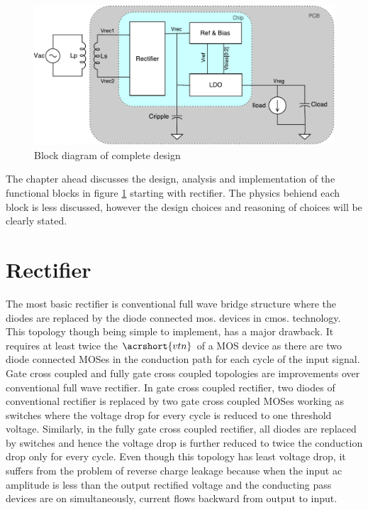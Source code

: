 \documentclass[12pt,a4paper,UKenglish]{article}
\begin{document}
\begin{figure}[!htbp] %
   \centering
   \includegraphics[width=\textwidth]{img/block_diagram.pdf}
   \caption{Block diagram of complete design}
   \label{fig:funct_block}
\end{figure}

The chapter ahead discusses the design, analysis and implementation of the functional blocks in figure 
\ref{fig:funct_block} starting with rectifier. The physics behiend each block is less discussed, however the 
design choices and reasoning of choices will be clearly stated. 

\clearpage
\newpage

\section{Rectifier}
The most basic rectifier is conventional full wave bridge structure where the diodes are replaced by the diode connected \acrshort{mos}. devices in \acrshort{cmos}. technology. This topology though being simple to implement, has a major drawback. It requires at least twice the $\acrshort{vtn}$ of a MOS device as there are two diode connected MOSes in the conduction path for each cycle of the input signal.  \\

Gate cross coupled and fully gate cross coupled topologies are improvements over conventional full wave rectifier. In gate cross coupled rectifier, two diodes of conventional rectifier is replaced by two gate cross coupled MOSes working as switches where the voltage drop for every cycle is reduced to one threshold voltage. Similarly, in the fully gate cross coupled rectifier, all diodes are replaced by switches and hence the voltage drop is further reduced to twice the conduction drop only for every cycle. Even though this topology has least voltage drop, it suffers from the problem of reverse charge leakage because when the input ac amplitude is less than the output rectified voltage and the conducting pass devices are on simultaneously, current flows backward from output to input. \\
\end{document}
